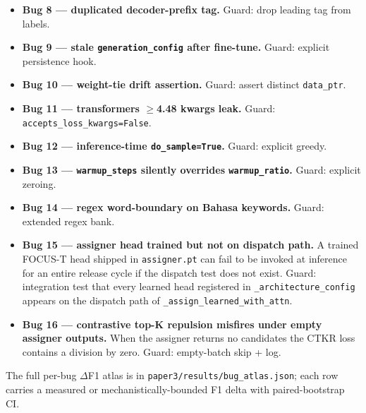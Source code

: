 \begin{itemize}
\item \textbf{Bug 8 --- duplicated decoder-prefix tag.}  Guard: drop
      leading tag from labels.

\item \textbf{Bug 9 --- stale \texttt{generation\_config} after
      fine-tune.}  Guard: explicit persistence hook.

\item \textbf{Bug 10 --- weight-tie drift assertion.}  Guard:
      assert distinct \texttt{data\_ptr}.

\item \textbf{Bug 11 --- transformers $\geq$4.48 kwargs leak.}
      Guard: \texttt{accepts\_loss\_kwargs=False}.

\item \textbf{Bug 12 --- inference-time \texttt{do\_sample=True}.}
      Guard: explicit greedy.

\item \textbf{Bug 13 --- \texttt{warmup\_steps} silently overrides
      \texttt{warmup\_ratio}.}  Guard: explicit zeroing.

\item \textbf{Bug 14 --- regex word-boundary on Bahasa keywords.}
      Guard: extended regex bank.

\item \textbf{Bug 15 --- assigner head trained but not on dispatch
      path.}  A trained FOCUS-T head shipped in
      \texttt{assigner.pt} can fail to be invoked at inference for an
      entire release cycle if the dispatch test does not exist.
      Guard: integration test that every learned head registered in
      \texttt{\_architecture\_config} appears on the dispatch path of
      \texttt{\_assign\_learned\_with\_attn}.

\item \textbf{Bug 16 --- contrastive top-K repulsion misfires under
      empty assigner outputs.}  When the assigner returns no
      candidates the CTKR loss contains a division by zero.  Guard:
      empty-batch skip + log.
\end{itemize}

The full per-bug $\Delta$F1 atlas is in
\texttt{paper3/results/bug\_atlas.json}; each row carries a measured
or mechanistically-bounded F1 delta with paired-bootstrap CI.
